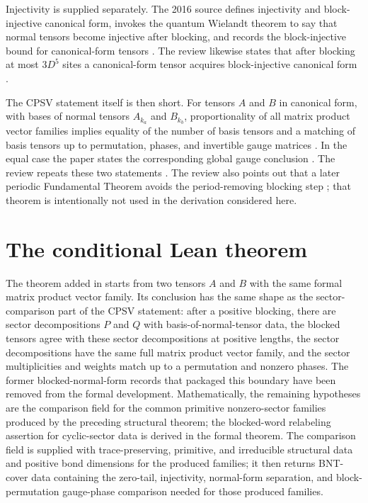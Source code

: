 \documentclass{article}
\begin{document}
Injectivity is supplied separately. The 2016 source defines injectivity and
block-injective canonical form, invokes the quantum Wielandt theorem to say that
normal tensors become injective after blocking, and records the block-injective
bound for canonical-form tensors
\cite[lines~317--344]{Cirac2016MPDO_arXiv}. The review likewise states that
after blocking at most $3D^5$ sites a canonical-form tensor acquires
block-injective canonical form
\cite[lines~2114--2124]{Cirac2021Matrix}.

The CPSV statement itself is then short. For tensors $A$ and $B$ in
canonical form, with bases of normal tensors $A_{k_a}$ and $B_{k_b}$,
proportionality of all matrix product vector families implies equality of the
number of basis tensors and a matching of basis tensors up to permutation,
phases, and invertible gauge matrices
\cite[Theorem~\texttt{thm1}, lines~347--352]{Cirac2016MPDO_arXiv}. In the equal
case the paper states the corresponding global gauge conclusion
\cite[Corollary~\texttt{II\_cor2}, lines~354--360]{Cirac2016MPDO_arXiv}. The
review repeats these two statements
\cite[Theorem~\texttt{thm1} and Corollary~\texttt{II\_cor2}, lines~1891--1900]{Cirac2021Matrix}.
The review also points out that a later periodic Fundamental Theorem avoids the
period-removing blocking step
\cite[lines~1908--1909]{Cirac2021Matrix}; that theorem is intentionally not used
in the derivation considered here.

\section{The conditional Lean theorem}

The theorem added in  starts from two tensors $A$ and $B$ with the
same formal matrix product vector family. Its conclusion has the same shape as
the sector-comparison part of the CPSV statement: after a positive blocking,
there are sector decompositions $P$ and $Q$ with basis-of-normal-tensor data, the
blocked tensors agree with these sector decompositions at positive lengths, the
sector decompositions have the same full matrix product vector family, and the
sector multiplicities and weights match up to a permutation and nonzero phases.
The former blocked-normal-form records that packaged this boundary have been
removed from the formal development. Mathematically, the remaining hypotheses
are the comparison field for the common primitive nonzero-sector families
produced by the preceding structural theorem; the blocked-word relabeling
assertion for cyclic-sector data is derived in the formal theorem. The comparison
field is supplied with trace-preserving, primitive, and irreducible structural
data and positive bond dimensions for the produced families; it then returns
BNT-cover data containing the zero-tail, injectivity, normal-form separation,
and block-permutation gauge-phase comparison needed for those produced families.
\end{document}
